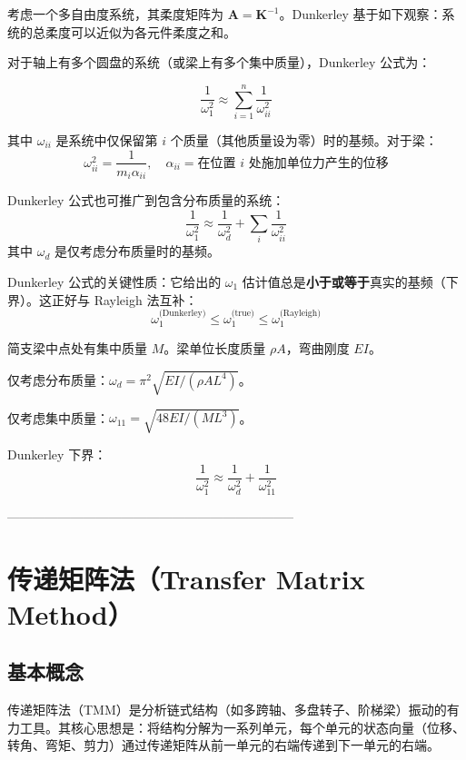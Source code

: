 考虑一个多自由度系统，其柔度矩阵为 $\mathbf{A} = \mathbf{K}^{-1}$。Dunkerley 基于如下观察：系统的总柔度可以近似为各元件柔度之和。

对于轴上有多个圆盘的系统（或梁上有多个集中质量），Dunkerley 公式为：

\begin{myformula}
\[
\frac{1}{\omega_1^2} \approx \sum_{i=1}^{n} \frac{1}{\omega_{ii}^2}
\]
\end{myformula}

其中 $\omega_{ii}$ 是系统中仅保留第 $i$ 个质量（其他质量设为零）时的基频。对于梁：
\[
\omega_{ii}^2 = \frac{1}{m_i \alpha_{ii}}, \quad \alpha_{ii} = \text{在位置 } i \text{ 处施加单位力产生的位移}
\]

Dunkerley 公式也可推广到包含分布质量的系统：
\[
\frac{1}{\omega_1^2} \approx \frac{1}{\omega_{d}^2} + \sum_{i}\frac{1}{\omega_{ii}^2}
\]
其中 $\omega_d$ 是仅考虑分布质量时的基频。

\begin{remark}
Dunkerley 公式的关键性质：它给出的 $\omega_1$ 估计值总是\textbf{小于或等于}真实的基频（下界）。这正好与 Rayleigh 法互补：
\[
\omega_1^{\text{(Dunkerley)}} \le \omega_1^{\text{(true)}} \le \omega_1^{\text{(Rayleigh)}}
\]
\end{remark}

\begin{example}
简支梁中点处有集中质量 $M$。梁单位长度质量 $\rho A$，弯曲刚度 $EI$。

仅考虑分布质量：$\omega_d = \pi^2\sqrt{EI/(\rho A L^4)}$。

仅考虑集中质量：$\omega_{11} = \sqrt{48EI/(M L^3)}$。

Dunkerley 下界：
\[
\frac{1}{\omega_1^2} \approx \frac{1}{\omega_d^2} + \frac{1}{\omega_{11}^2}
\]
\end{example}

--------------------------------------------------------------------
\section{传递矩阵法（Transfer Matrix Method）}

\subsection{基本概念}

传递矩阵法（TMM）是分析链式结构（如多跨轴、多盘转子、阶梯梁）振动的有力工具。其核心思想是：将结构分解为一系列单元，每个单元的状态向量（位移、转角、弯矩、剪力）通过传递矩阵从前一单元的右端传递到下一单元的右端。

